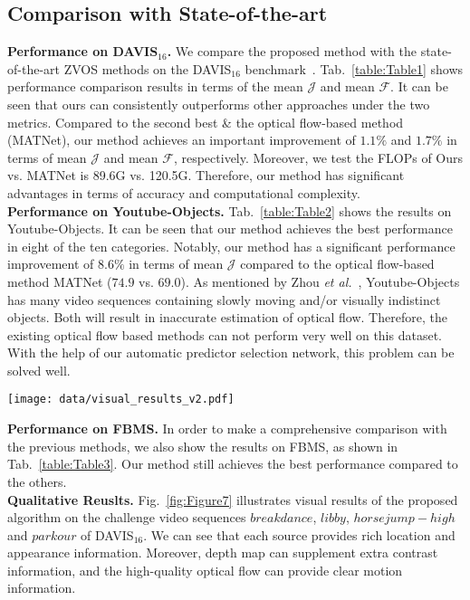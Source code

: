 \documentclass[sigconf]{acmart}
\begin{document}
\subsection{Comparison with State-of-the-art}
\noindent\textbf{Performance on DAVIS$_{16}$.}
We compare the proposed method with the state-of-the-art ZVOS methods on the DAVIS$_{16}$ benchmark~\cite{davis16}. Tab.~\ref{table:Table1} shows performance comparison results in terms of the mean $\mathcal{J}$ and mean $\mathcal{F}$.
It can be seen that ours can consistently outperforms other approaches under the two metrics.  Compared to the second best \& the optical flow-based method (MATNet), our method achieves an important improvement of $1.1\%$ and $1.7\%$ in terms of mean $\mathcal{J}$ and mean $\mathcal{F}$, respectively. Moreover, we test the FLOPs of Ours vs. MATNet is 89.6G vs. 120.5G. Therefore, our method has significant advantages in terms of accuracy and computational complexity.\\  
\textbf{Performance on Youtube-Objects.} Tab.~\ref{table:Table2} shows the results on Youtube-Objects. It can be seen that our method achieves the best performance in eight of the ten categories.  Notably, our method has a significant performance improvement of $8.6\%$ in terms of mean $\mathcal{J}$ compared to the optical flow-based method MATNet ($74.9$ vs. $69.0$). As mentioned by Zhou \textit{et al.}~\cite{MATNet}, Youtube-Objects has many video sequences containing slowly moving and/or visually indistinct objects. Both will result in inaccurate estimation of optical flow. Therefore, the existing optical flow based methods can not perform very well on this dataset. With the help of our automatic predictor selection network, this problem can be solved well.\\
\begin{figure*}
    \texttt{[image: data/visual\_results\_v2.pdf]}\\ \centering
    \caption{Qualitative results on four sequences $breakdance$, $libby$, $horsejump-high$ and $parkour$ of DAVIS$_{16}$.} 		
    \label{fig:Figure7}
\end{figure*}
\textbf{Performance on FBMS.} In order to make a comprehensive comparison with the previous methods, we also show the results on FBMS, as shown in Tab.~\ref{table:Table3}. Our method still achieves the best performance compared to the others.\\
\textbf{Qualitative Reuslts.}
 Fig.~\ref{fig:Figure7} illustrates visual results of the proposed algorithm on the challenge video sequences $breakdance$, $libby$, $horsejump-high$ and $parkour$ of DAVIS$_{16}$. We can see that each source provides rich location and appearance information. Moreover, depth map can supplement extra contrast information, and the high-quality optical flow can provide clear motion information.  
\end{document}
